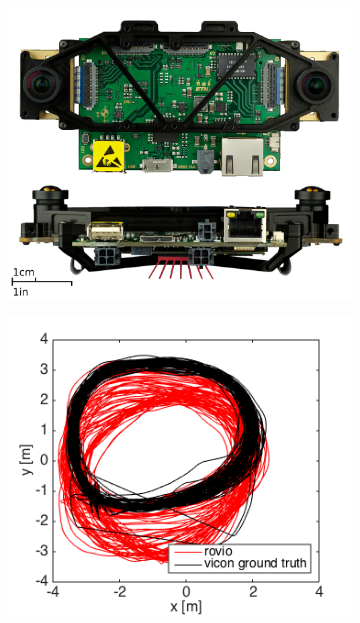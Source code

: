 \begin{figure}
  \begin{subfigure}[b]{0.3\textwidth}
    \includegraphics[width=\textwidth]{images/visensor.png}
    \caption{}
    \label{fig:1}
  \end{subfigure}
  \hfill
  \begin{subfigure}[b]{0.34\textwidth}
    \includegraphics[width=\textwidth]{images/ijrr/2D_rovio.png}
    \caption{}
    \label{fig:2}
  \end{subfigure}

\end{figure}
